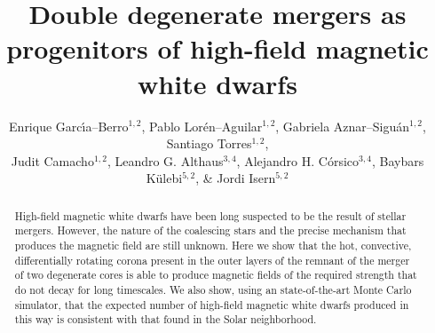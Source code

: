 \documentclass[]{emulateapj}
\begin{document}
\title{Double degenerate mergers as progenitors of high-field magnetic white 
       dwarfs}

\author{Enrique Garc\'\i a--Berro$^{1,2}$,
        Pablo Lor\'en--Aguilar$^{1,2}$,
        Gabriela Aznar--Sigu\'an$^{1,2}$,
        Santiago Torres$^{1,2}$,\\
        Judit Camacho$^{1,2}$,
        Leandro  G.  Althaus$^{3,4}$,
        Alejandro H. C\'orsico$^{3,4}$, 
        Baybars K\"ulebi$^{5,2}$, \&
        Jordi Isern$^{5,2}$}



\begin{abstract}
High-field magnetic  white dwarfs have  been long suspected to  be the
result of stellar mergers. However, the nature of the coalescing stars
and the precise  mechanism that produces the magnetic  field are still
unknown.   Here  we  show  that the  hot,  convective,  differentially
rotating  corona present in  the outer  layers of  the remnant  of the
merger of two  degenerate cores is able to  produce magnetic fields of
the required strength that do  not decay for long timescales.  We also
show,  using  an  state-of-the-art  Monte Carlo  simulator,  that  the
expected number  of high-field magnetic white dwarfs  produced in this
way is consistent with that found in the Solar neighborhood.
\end{abstract}

\end{document}
